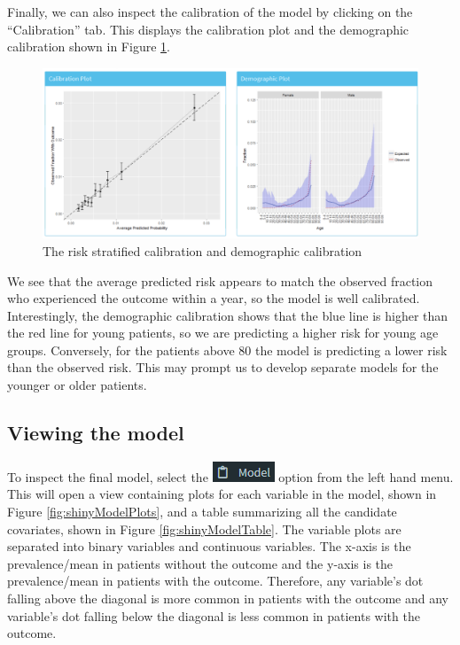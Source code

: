 \documentclass[11pt]{book}
\theoremstyle{definition}
\theoremstyle{definition}
\theoremstyle{definition}
\theoremstyle{remark}
\begin{document}
Finally, we can also inspect the calibration of the model by clicking on the ``Calibration'' tab. This displays the calibration plot and the demographic calibration shown in Figure \ref{fig:shinyPerformanceCal}.

\begin{figure}

{\centering \includegraphics[width=1\linewidth]{images/PatientLevelPrediction/shiny/shinyPerformanceCal} 

}

\caption{The risk stratified calibration and demographic calibration}\label{fig:shinyPerformanceCal}
\end{figure}

We see that the average predicted risk appears to match the observed fraction who experienced the outcome within a year, so the model is well calibrated. Interestingly, the demographic calibration shows that the blue line is higher than the red line for young patients, so we are predicting a higher risk for young age groups. Conversely, for the patients above 80 the model is predicting a lower risk than the observed risk. This may prompt us to develop separate models for the younger or older patients.

\hypertarget{viewing-the-model}{%
\subsection{Viewing the model}\label{viewing-the-model}}

To inspect the final model, select the \includegraphics{images/PatientLevelPrediction/modelButton.png} option from the left hand menu. This will open a view containing plots for each variable in the model, shown in Figure \ref{fig:shinyModelPlots}, and a table summarizing all the candidate covariates, shown in Figure \ref{fig:shinyModelTable}. The variable plots are separated into binary variables and continuous variables. The x-axis is the prevalence/mean in patients without the outcome and the y-axis is the prevalence/mean in patients with the outcome. Therefore, any variable's dot falling above the diagonal is more common in patients with the outcome and any variable's dot falling below the diagonal is less common in patients with the outcome.
\end{document}
